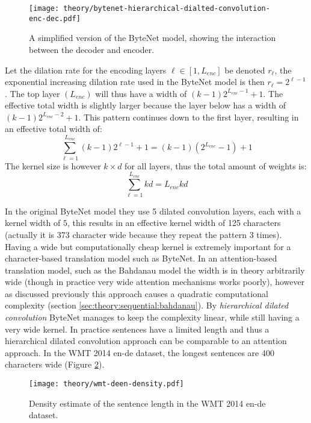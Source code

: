 \begin{figure}[h]
    \centering
    \texttt{[image: theory/bytenet-hierarchical-dialted-convolution-enc-dec.pdf]}
    \caption{A simplified version of the ByteNet model, showing the interaction between the decoder and encoder.}
    \label{fig:bytenet:simplified-hdc}
\end{figure}

Let the dilation rate for the encoding layers $\ell \in [1, L_{enc}]$ be denoted $r_\ell$, the exponential increasing dilation rate used in the ByteNet model is then $r_\ell = 2^{\ell - 1}$. The top layer $(L_{enc})$ will thus have a width of $(k-1) 2^{L_{enc} -1} + 1$. The effective total width is slightly larger because the layer below has a width of $(k-1) 2^{L_{enc} - 2} + 1$. This pattern continues down to the first layer, resulting in an effective total width of:
\begin{equation}
\sum_{\ell = 1}^{L_{enc}} (k - 1) 2^{\ell-1} + 1 = (k - 1) (2^{L_{enc}} - 1) + 1
\end{equation}
The kernel size is however $k \times d$ for all layers, thus the total amount of weights is:
\begin{equation}
\sum_{\ell = 1}^{L_{enc}} k d = L_{enc} k d
\end{equation}

In the original ByteNet model they use 5 dilated convolution layers, each with a kernel width of $5$, this results in an effective kernel width of 125 characters (actually it is 373 character wide because they repeat the pattern 3 times). Having a wide but computationally cheap kernel is extremely important for a character-based translation model such as ByteNet. In an attention-based translation model, such as the Bahdanau model \cite{bahdanau-2015-nmt} the width is in theory arbitrarily wide (though in practice very wide attention mechanisms works poorly), however as discussed previously this approach causes a quadratic computational complexity (section \ref{sec:theory:sequential:bahdanau}). By \textit{hierarchical dilated convolution} ByteNet manages to keep the complexity linear, while still having a very wide kernel. In practice sentences have a limited length and thus a hierarchical dilated convolution approach can be comparable to an attention approach. In the WMT 2014 en-de dataset, the longest sentences are 400 characters wide (Figure \ref{fig:bytenet:wmt-deen-density}).

\begin{figure}[h]
    \centering
    \texttt{[image: theory/wmt-deen-density.pdf]}
    \caption{Density estimate of the sentence length in the WMT 2014 en-de dataset.}
    \label{fig:bytenet:wmt-deen-density}
\end{figure}


